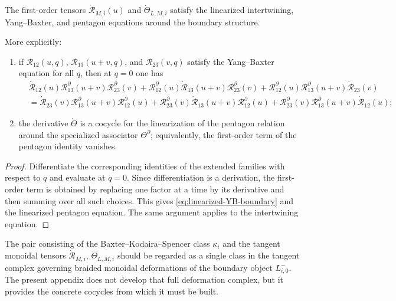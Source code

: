 \begin{theorem}
\ClaimStatusProvedHere
\label{thm:linearized-boundary-equations}
The first-order tensors
$\dot{\mathscr R}_{M,i}(u)$ and $\dot\Theta_{L,M,i}$ satisfy the
linearized intertwining, Yang--Baxter, and pentagon equations around the
boundary structure.

More explicitly:
\begin{enumerate}
 \item if $\mathscr R_{12}(u,q)$,
 $\mathscr R_{13}(u+v,q)$, and $\mathscr R_{23}(v,q)$ satisfy the
 Yang--Baxter equation for all $q$, then at $q=0$ one has
 \begin{align}
 &\dot{\mathscr R}_{12}(u)
 \mathscr R^{\partial}_{13}(u+v)
 \mathscr R^{\partial}_{23}(v)
 +
 \mathscr R^{\partial}_{12}(u)
 \dot{\mathscr R}_{13}(u+v)
 \mathscr R^{\partial}_{23}(v)
 +
 \mathscr R^{\partial}_{12}(u)
 \mathscr R^{\partial}_{13}(u+v)
 \dot{\mathscr R}_{23}(v)
 \nonumber\\
 &=
 \dot{\mathscr R}_{23}(v)
 \mathscr R^{\partial}_{13}(u+v)
 \mathscr R^{\partial}_{12}(u)
 +
 \mathscr R^{\partial}_{23}(v)
 \dot{\mathscr R}_{13}(u+v)
 \mathscr R^{\partial}_{12}(u)
 +
 \mathscr R^{\partial}_{23}(v)
 \mathscr R^{\partial}_{13}(u+v)
 \dot{\mathscr R}_{12}(u);
 \label{eq:linearized-YB-boundary}
 \end{align}
 \item the derivative $\dot\Theta$ is a cocycle for the linearization
 of the pentagon relation around the specialized associator
 $\Theta^{\partial}$; equivalently, the first-order term of the
 pentagon identity vanishes.
\end{enumerate}
\end{theorem}

\begin{proof}
Differentiate the corresponding identities of the extended families with
respect to $q$ and evaluate at $q=0$. Since differentiation is a
derivation, the first-order term is obtained by replacing one factor at a
time by its derivative and then summing over all such choices. This gives
\eqref{eq:linearized-YB-boundary} and the linearized pentagon equation.
The same argument applies to the intertwining equation.
\end{proof}

\begin{remark}
\label{rem:boundary-deformation-complex}
The pair consisting of the Baxter--Kodaira--Spencer class $\kappa_i$ and
the tangent monoidal tensors $\dot{\mathscr R}_{M,i}$,
$\dot\Theta_{L,M,i}$ should be regarded as a single class in the tangent
complex governing braided monoidal deformations of the boundary object
$L^-_{i,0}$. The present appendix does not develop that full deformation
complex, but it provides the concrete cocycles from which it must be
built.
\end{remark}

